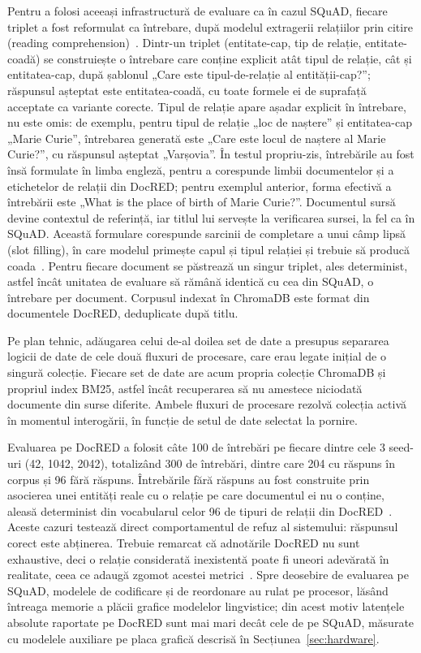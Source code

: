 Pentru a folosi aceeași infrastructură de evaluare ca în cazul SQuAD, fiecare triplet a fost reformulat ca întrebare, după modelul extragerii relațiilor prin citire (reading comprehension)~\cite{levy2017zeroshot}. Dintr-un triplet (entitate-cap, tip de relație, entitate-coadă) se construiește o întrebare care conține explicit atât tipul de relație, cât și entitatea-cap, după șablonul „Care este tipul-de-relație al entității-cap?”; răspunsul așteptat este entitatea-coadă, cu toate formele ei de suprafață acceptate ca variante corecte. Tipul de relație apare așadar explicit în întrebare, nu este omis: de exemplu, pentru tipul de relație „loc de naștere” și entitatea-cap „Marie Curie”, întrebarea generată este „Care este locul de naștere al Marie Curie?”, cu răspunsul așteptat „Varșovia”. În testul propriu-zis, întrebările au fost însă formulate în limba engleză, pentru a corespunde limbii documentelor și a etichetelor de relații din DocRED; pentru exemplul anterior, forma efectivă a întrebării este „What is the place of birth of Marie Curie?”. Documentul sursă devine contextul de referință, iar titlul lui servește la verificarea sursei, la fel ca în SQuAD. Această formulare corespunde sarcinii de completare a unui câmp lipsă (slot filling), în care modelul primește capul și tipul relației și trebuie să producă coada~\cite{levy2017zeroshot, zhang2017tacred}. Pentru fiecare document se păstrează un singur triplet, ales determinist, astfel încât unitatea de evaluare să rămână identică cu cea din SQuAD, o întrebare per document. Corpusul indexat în ChromaDB este format din documentele DocRED, deduplicate după titlu.

Pe plan tehnic, adăugarea celui de-al doilea set de date a presupus separarea logicii de date de cele două fluxuri de procesare, care erau legate inițial de o singură colecție. Fiecare set de date are acum propria colecție ChromaDB și propriul index BM25, astfel încât recuperarea să nu amestece niciodată documente din surse diferite. Ambele fluxuri de procesare rezolvă colecția activă în momentul interogării, în funcție de setul de date selectat la pornire.

Evaluarea pe DocRED a folosit câte 100 de întrebări pe fiecare dintre cele 3 seed-uri (42, 1042, 2042), totalizând 300 de întrebări, dintre care 204 cu răspuns în corpus și 96 fără răspuns. Întrebările fără răspuns au fost construite prin asocierea unei entități reale cu o relație pe care documentul ei nu o conține, aleasă determinist din vocabularul celor 96 de tipuri de relații din DocRED~\cite{yao2019docred}. Aceste cazuri testează direct comportamentul de refuz al sistemului: răspunsul corect este abținerea. Trebuie remarcat că adnotările DocRED nu sunt exhaustive, deci o relație considerată inexistentă poate fi uneori adevărată în realitate, ceea ce adaugă zgomot acestei metrici~\cite{tan2022redocred}. Spre deosebire de evaluarea pe SQuAD, modelele de codificare și de reordonare au rulat pe procesor, lăsând întreaga memorie a plăcii grafice modelelor lingvistice; din acest motiv latențele absolute raportate pe DocRED sunt mai mari decât cele de pe SQuAD, măsurate cu modelele auxiliare pe placa grafică descrisă în Secțiunea~\ref{sec:hardware}.


